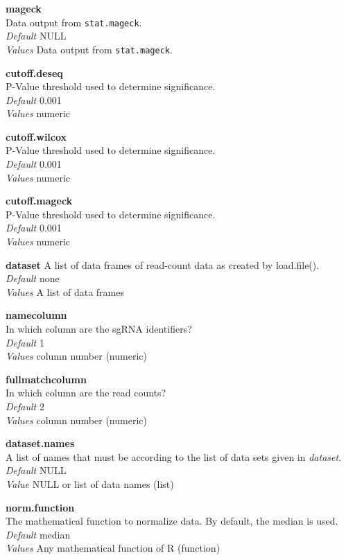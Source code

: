 \documentclass[]{article}
\begin{document}
\textbf{mageck}\\
Data output from \texttt{stat.mageck}.\\
\emph{Default} NULL\\
\emph{Values} Data output from \texttt{stat.mageck}.

\textbf{cutoff.deseq}\\
P-Value threshold used to determine significance.\\
\emph{Default} 0.001\\
\emph{Values} numeric

\textbf{cutoff.wilcox}\\
P-Value threshold used to determine significance.\\
\emph{Default} 0.001\\
\emph{Values} numeric

\textbf{cutoff.mageck}\\
P-Value threshold used to determine significance.\\
\emph{Default} 0.001\\
\emph{Values} numeric

\textbf{dataset} A list of data frames of read-count data as created by
load.file().\\
\emph{Default} none\\
\emph{Values} A list of data frames

\textbf{namecolumn}\\
In which column are the sgRNA identifiers?\\
\emph{Default} 1\\
\emph{Values} column number (numeric)

\textbf{fullmatchcolumn}\\
In which column are the read counts?\\
\emph{Default} 2\\
\emph{Values} column number (numeric)

\textbf{dataset.names}\\
A list of names that must be according to the list of data sets given in
\emph{dataset}.\\
\emph{Default} NULL\\
\emph{Value} NULL or list of data names (list)

\textbf{norm.function}\\
The mathematical function to normalize data. By default, the median is
used.\\
\emph{Default} median\\
\emph{Values} Any mathematical function of R (function)
\end{document}
